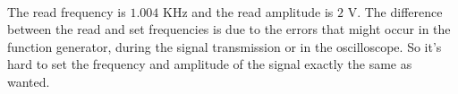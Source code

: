 \documentclass[11pt]{article}
\begin{document}
\begin{question}
{        \paragraph*{}
        The read frequency is $1.004$ KHz and the read amplitude is $2$ V. The difference between the read and set frequencies is due to the errors that might occur in the function generator, during the signal transmission or in the oscilloscope.
         So it's hard to set the frequency and amplitude of the signal exactly the same as wanted.}

\end{question}

\end{document}
